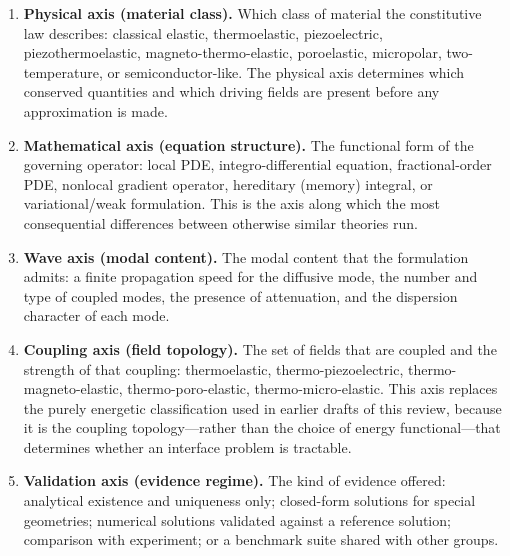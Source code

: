 \begin{enumerate}[label=\textbf{Axis \arabic*:}]
\item \textbf{Physical axis (material class).} Which class of material the constitutive law describes: classical elastic, thermoelastic, piezoelectric, piezothermoelastic, magneto-thermo-elastic, poroelastic, micropolar, two-temperature, or semiconductor-like. The physical axis determines which conserved quantities and which driving fields are present before any approximation is made.

\item \textbf{Mathematical axis (equation structure).} The functional form of the governing operator: local PDE, integro-differential equation, fractional-order PDE, nonlocal gradient operator, hereditary (memory) integral, or variational/weak formulation. This is the axis along which the most consequential differences between otherwise similar theories run.

\item \textbf{Wave axis (modal content).} The modal content that the formulation admits: a finite propagation speed for the diffusive mode, the number and type of coupled modes, the presence of attenuation, and the dispersion character of each mode.

\item \textbf{Coupling axis (field topology).} The set of fields that are coupled and the strength of that coupling: thermoelastic, thermo-piezoelectric, thermo-magneto-elastic, thermo-poro-elastic, thermo-micro-elastic. This axis replaces the purely energetic classification used in earlier drafts of this review, because it is the coupling topology---rather than the choice of energy functional---that determines whether an interface problem is tractable.

\item \textbf{Validation axis (evidence regime).} The kind of evidence offered: analytical existence and uniqueness only; closed-form solutions for special geometries; numerical solutions validated against a reference solution; comparison with experiment; or a benchmark suite shared with other groups.
\end{enumerate}

